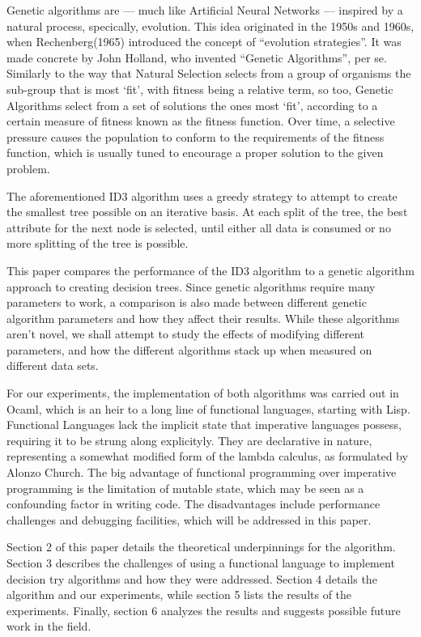 \documentclass[12pt, letterpaper]{article}
\begin{document}
Genetic algorithms are --- much like Artificial Neural Networks --- inspired by a natural process, specically, evolution. This idea originated in the 1950s and 1960s, when Rechenberg(1965) introduced the concept of ``evolution strategies''\cite{melanie1999introduction}. It was made concrete by John Holland, who invented ``Genetic Algorithms'', per se\cite{holland197388}. Similarly to the way that Natural Selection selects from a group of organisms the sub-group that is most `fit', with fitness being a relative term, so too, Genetic Algorithms select from a set of solutions the ones most `fit', according to a certain measure of fitness known as the fitness function. Over time, a selective pressure causes the population to conform to the requirements of the fitness function, which is usually tuned to encourage a proper solution to the given problem.

The aforementioned ID3\cite{quinlan1986induction} algorithm uses a greedy strategy to attempt to create the smallest tree possible on an iterative basis. At each split of the tree, the best attribute for the next node is selected, until either all data is consumed or no more splitting of the tree is possible.

This paper compares the performance of the ID3 algorithm to a genetic algorithm approach to creating decision trees. Since genetic algorithms require many parameters to work, a comparison is also made between different genetic algorithm parameters and how they affect their results. While these algorithms aren't novel, we shall attempt to study the effects of modifying different parameters, and how the different algorithms stack up when measured on different data sets. 

For our experiments, the implementation of both algorithms was carried out in Ocaml, which is an heir to a long line of functional languages, starting with Lisp\cite{hudak1989conception}. Functional Languages lack the implicit state that imperative languages possess, requiring it to be strung along explicityly. They are declarative in nature, representing a somewhat modified form of the lambda calculus, as formulated by Alonzo Church. The big advantage of functional programming over imperative programming is the limitation of mutable state, which may be seen as a confounding factor in writing code. The disadvantages include performance challenges and debugging facilities, which will be addressed in this paper.

Section 2 of this paper details the theoretical underpinnings for the algorithm. Section 3 describes the challenges of using a functional language to implement decision try algorithms and how they were addressed. Section 4 details the algorithm and our experiments, while section 5 lists the results of the experiments. Finally, section 6 analyzes the results and suggests possible future work in the field.
\end{document}
